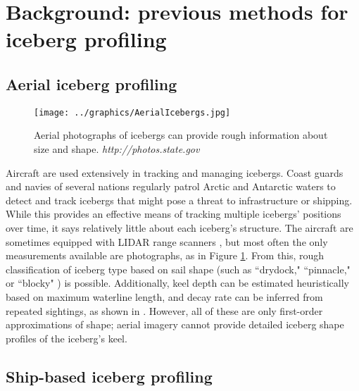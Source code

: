 \section{Background: previous methods for iceberg profiling}



\subsection{Aerial iceberg profiling}

\begin{figure}[!htb]
   \centering
   \texttt{[image: ../graphics/AerialIcebergs.jpg]} %
   \caption{ Aerial photographs of icebergs can provide rough information about size and shape. \emph{http://photos.state.gov}}
   \label{fig:IcebergAerial}
\end{figure}

Aircraft are used extensively in tracking and managing icebergs. Coast guards and navies of several nations regularly patrol Arctic and Antarctic waters to detect and track icebergs that might pose a threat to infrastructure or shipping. While this provides an effective means of tracking multiple icebergs' positions over time, it says relatively little about each iceberg's structure. The aircraft are sometimes equipped with LIDAR range scanners \cite{Bunkin2012}, but most often the only measurements available are photographs, as in Figure \ref{fig:IcebergAerial}. From this, rough classification of iceberg type based on sail shape (such as ``drydock," ``pinnacle," or ``blocky" ) is possible. Additionally, keel depth can be estimated heuristically based on maximum waterline length, and decay rate can be inferred from repeated sightings, as shown in \cite{Barker2004}. However, all of these are only first-order approximations of shape; aerial imagery cannot provide detailed iceberg shape profiles of the iceberg's keel. 

\subsection{Ship-based iceberg profiling}

